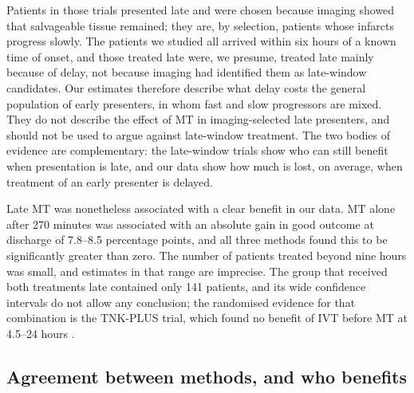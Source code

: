 Patients in those trials presented late and were chosen because imaging showed that salvageable tissue remained; they are, by selection, patients whose infarcts progress slowly. The patients we studied all arrived within six hours of a known time of onset, and those treated late were, we presume, treated late mainly because of delay, not because imaging had identified them as late-window candidates. Our estimates therefore describe what delay costs the general population of early presenters, in whom fast and slow progressors are mixed. They do not describe the effect of MT in imaging-selected late presenters, and should not be used to argue against late-window treatment. The two bodies of evidence are complementary: the late-window trials show who can still benefit when presentation is late, and our data show how much is lost, on average, when treatment of an early presenter is delayed.

Late MT was nonetheless associated with a clear benefit in our data. MT alone after 270 minutes was associated with an absolute gain in good outcome at discharge of 7.8--8.5 percentage points, and all three methods found this to be significantly greater than zero. The number of patients treated beyond nine hours was small, and estimates in that range are imprecise. The group that received both treatments late contained only 141 patients, and its wide confidence intervals do not allow any conclusion; the randomised evidence for that combination is the TNK-PLUS trial, which found no benefit of IVT before MT at 4.5--24 hours .

\subsection{Agreement between methods, and who benefits}

